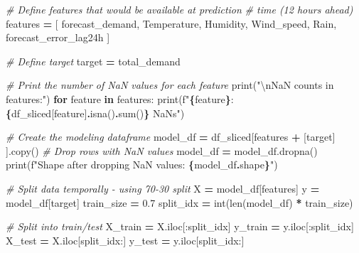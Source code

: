 \documentclass[mstat,12pt]{unswthesis}
\newenvironment{Shaded}{\begin{snugshade}}{\end{snugshade}}
\newcommand{\BuiltInTok}[1]{#1}
\newcommand{\CharTok}[1]{\textcolor[rgb]{0.31,0.60,0.02}{#1}}
\newcommand{\CommentTok}[1]{\textcolor[rgb]{0.56,0.35,0.01}{\textit{#1}}}
\newcommand{\ControlFlowTok}[1]{\textcolor[rgb]{0.13,0.29,0.53}{\textbf{#1}}}
\newcommand{\FloatTok}[1]{\textcolor[rgb]{0.00,0.00,0.81}{#1}}
\newcommand{\KeywordTok}[1]{\textcolor[rgb]{0.13,0.29,0.53}{\textbf{#1}}}
\newcommand{\NormalTok}[1]{#1}
\newcommand{\OperatorTok}[1]{\textcolor[rgb]{0.81,0.36,0.00}{\textbf{#1}}}
\newcommand{\SpecialCharTok}[1]{\textcolor[rgb]{0.81,0.36,0.00}{\textbf{#1}}}
\newcommand{\SpecialStringTok}[1]{\textcolor[rgb]{0.31,0.60,0.02}{#1}}
\newcommand{\StringTok}[1]{\textcolor[rgb]{0.31,0.60,0.02}{#1}}
\begin{document}
\begin{Shaded}
\begin{Highlighting}[]
\CommentTok{\# Define features that would be available at prediction }
\CommentTok{\# time (12 hours ahead)}
\NormalTok{features }\OperatorTok{=}\NormalTok{ [}
    \StringTok{\textquotesingle{}forecast\_demand\textquotesingle{}}\NormalTok{,}
    \StringTok{\textquotesingle{}Temperature\textquotesingle{}}\NormalTok{,}
    \StringTok{\textquotesingle{}Humidity\textquotesingle{}}\NormalTok{,}
    \StringTok{\textquotesingle{}Wind\_speed\textquotesingle{}}\NormalTok{,}
    \StringTok{\textquotesingle{}Rain\textquotesingle{}}\NormalTok{,}
    \StringTok{\textquotesingle{}forecast\_error\_lag24h\textquotesingle{}}
\NormalTok{]}


\CommentTok{\# Define target}
\NormalTok{target }\OperatorTok{=} \StringTok{\textquotesingle{}total\_demand\textquotesingle{}}


\CommentTok{\# Print the number of NaN values for each feature}
\BuiltInTok{print}\NormalTok{(}\StringTok{"}\CharTok{\textbackslash{}n}\StringTok{NaN counts in features:"}\NormalTok{)}
\ControlFlowTok{for}\NormalTok{ feature }\KeywordTok{in}\NormalTok{ features:}
    \BuiltInTok{print}\NormalTok{(}\SpecialStringTok{f"}\SpecialCharTok{\{}\NormalTok{feature}\SpecialCharTok{\}}\SpecialStringTok{: }\SpecialCharTok{\{}\NormalTok{df\_sliced[feature]}\SpecialCharTok{.}\NormalTok{isna()}\SpecialCharTok{.}\BuiltInTok{sum}\NormalTok{()}\SpecialCharTok{\}}\SpecialStringTok{ NaNs"}\NormalTok{)}

\CommentTok{\# Create the modeling dataframe}
\NormalTok{model\_df }\OperatorTok{=}\NormalTok{ df\_sliced[features }\OperatorTok{+}\NormalTok{ [target] ].copy()}
\CommentTok{\# Drop rows with NaN values}
\NormalTok{model\_df }\OperatorTok{=}\NormalTok{ model\_df.dropna()}
\BuiltInTok{print}\NormalTok{(}\SpecialStringTok{f"Shape after dropping NaN values: }\SpecialCharTok{\{}\NormalTok{model\_df}\SpecialCharTok{.}\NormalTok{shape}\SpecialCharTok{\}}\SpecialStringTok{"}\NormalTok{)}


\CommentTok{\# Split data temporally {-} using 70{-}30 split}
\NormalTok{X }\OperatorTok{=}\NormalTok{ model\_df[features]}
\NormalTok{y }\OperatorTok{=}\NormalTok{ model\_df[target]}
\NormalTok{train\_size }\OperatorTok{=} \FloatTok{0.7}
\NormalTok{split\_idx }\OperatorTok{=} \BuiltInTok{int}\NormalTok{(}\BuiltInTok{len}\NormalTok{(model\_df) }\OperatorTok{*}\NormalTok{ train\_size)}

\CommentTok{\# Split into train/test}
\NormalTok{X\_train }\OperatorTok{=}\NormalTok{ X.iloc[:split\_idx]}
\NormalTok{y\_train }\OperatorTok{=}\NormalTok{ y.iloc[:split\_idx]}
\NormalTok{X\_test }\OperatorTok{=}\NormalTok{ X.iloc[split\_idx:]}
\NormalTok{y\_test }\OperatorTok{=}\NormalTok{ y.iloc[split\_idx:]}



\end{Highlighting}
\end{Shaded}
\end{document}
